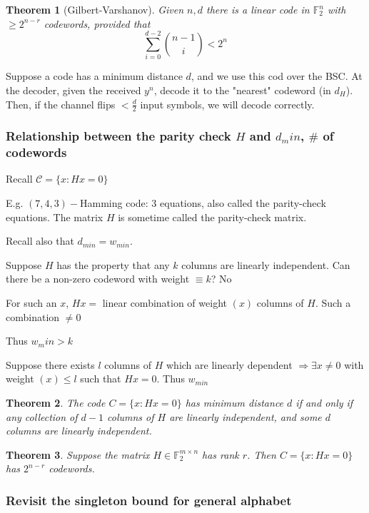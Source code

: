 \documentclass{article}
\newtheorem{theorem}{Theorem}[section]
\theoremstyle{definition} %
\def\F{\mathbb{F}}
\def\C{\mathscr{C}}
\begin{document}
\begin{theorem}[Gilbert-Varshanov]
  Given $n,d$ there is a linear code in $\F_2^n$ with $\geq 2 ^{n-r}$ codewords, provided that
  \[
    \sum_{i=0}^{d-2} {n-1 \choose i} < 2^n
  \]
\end{theorem}





Suppose a code has a minimum distance $d$, and we use this cod over the BSC. At the decoder, given the received $y^n$, decode it to the "nearest" codeword (in $d_H$). Then, if the channel flips $< \frac{d}{2}$ input symbols, we will decode correctly.

\subsubsection*{Relationship between the parity check $H$ and $d_min$, $\#$ of codewords}

Recall $\C = \{ x: Hx = 0\}$

E.g. $(7,4,3)-$Hamming code: 3 equations, also called the parity-check equations. The matrix $H$ is sometime called the parity-check matrix.

Recall also that $d_{min} = w_{min}$.

Suppose $H$ has the property that any $k$ columns are linearly independent. Can there be a non-zero codeword with weight $\equiv k$? No

For such an $x$, $Hx = $ linear combination of weight $(x)$ columns of $H$. Such a combination $\neq 0$

Thus $w_min > k$

Suppose there exists $l$ columns of $H$ which are linearly dependent $\Rightarrow \exists x \neq 0$ with weight $(x) \leq l$ such that $Hx = 0$. Thus $w_{min}$

\begin{theorem}
  The code $C = \{ x: Hx = 0 \}$ has minimum distance $d$ if and only if any collection of $d-1$ columns of $H$ are linearly independent, and some $d$ columns are linearly independent.
\end{theorem}

\begin{theorem}
  Suppose the matrix $H \in \F_2^{m \times n}$ has rank $r$. Then $C = \{ x: Hx = 0 \}$ has $2^{n - r}$ codewords.
\end{theorem}

\subsubsection{Revisit the singleton bound for general alphabet}
\end{document}

